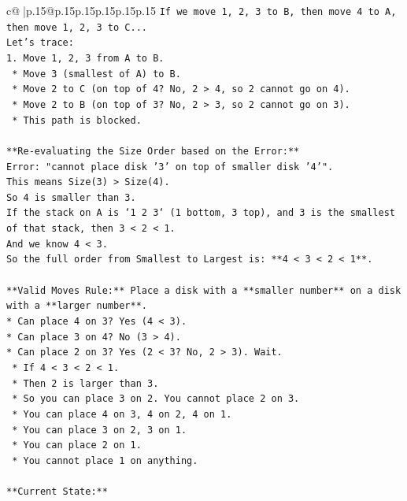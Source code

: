 \documentclass{article}
\begin{document}
{\begin{supertabular}{c@{$\;$}|p{.15\linewidth}@{}p{.15\linewidth}p{.15\linewidth}p{.15\linewidth}p{.15\linewidth}p{.15\linewidth}}
{{{\texttt{If we move 1, 2, 3 to B, then move 4 to A, then move 1, 2, 3 to C...} \\
\texttt{Let's trace:} \\
\texttt{1.  Move 1, 2, 3 from A to B.} \\
\texttt{    *   Move 3 (smallest of A) to B.} \\
\texttt{    *   Move 2 to C (on top of 4? No, 2 > 4, so 2 cannot go on 4).} \\
\texttt{    *   Move 2 to B (on top of 3? No, 2 > 3, so 2 cannot go on 3).} \\
\texttt{    *   This path is blocked.} \\
\\ 
\texttt{**Re{-}evaluating the Size Order based on the Error:**} \\
\texttt{Error: "cannot place disk '3' on top of smaller disk '4'".} \\
\texttt{This means Size(3) > Size(4).} \\
\texttt{So 4 is smaller than 3.} \\
\texttt{If the stack on A is `1 2 3` (1 bottom, 3 top), and 3 is the smallest of that stack, then 3 < 2 < 1.} \\
\texttt{And we know 4 < 3.} \\
\texttt{So the full order from Smallest to Largest is: **4 < 3 < 2 < 1**.} \\
\\ 
\texttt{**Valid Moves Rule:** Place a disk with a **smaller number** on a disk with a **larger number**.} \\
\texttt{*   Can place 4 on 3? Yes (4 < 3).} \\
\texttt{*   Can place 3 on 4? No (3 > 4).} \\
\texttt{*   Can place 2 on 3? Yes (2 < 3? No, 2 > 3). Wait.} \\
\texttt{    *   If 4 < 3 < 2 < 1.} \\
\texttt{    *   Then 2 is larger than 3.} \\
\texttt{    *   So you can place 3 on 2. You cannot place 2 on 3.} \\
\texttt{    *   You can place 4 on 3, 4 on 2, 4 on 1.} \\
\texttt{    *   You can place 3 on 2, 3 on 1.} \\
\texttt{    *   You can place 2 on 1.} \\
\texttt{    *   You cannot place 1 on anything.} \\
\\ 
\texttt{**Current State:**} \\
}}}
\end{supertabular}}
\end{document}
